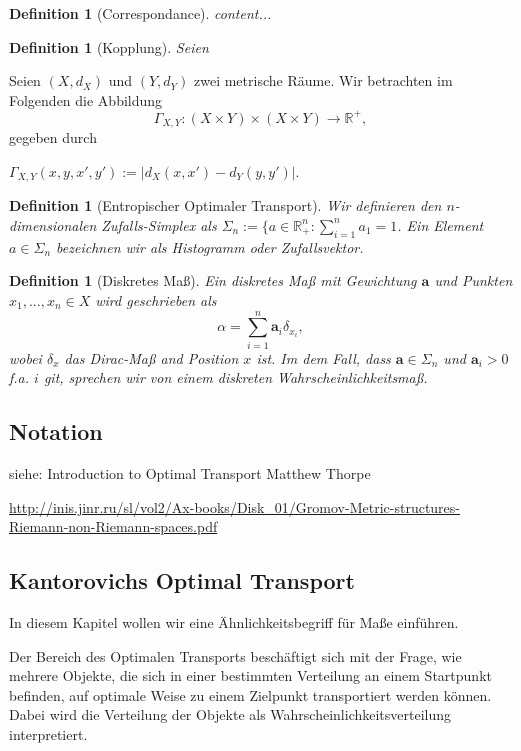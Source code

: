\documentclass[11pt,a4paper]{article}
\newtheorem{definition}[theorem]{Definition}
\numberwithin{equation}{section}
\begin{document}
	\begin{definition}[Correspondance]
		content...
	\end{definition}
	
	\begin{definition}[Kopplung]
		Seien 
	\end{definition}
	
	Seien $(X,d_X)$ und $(Y,d_Y)$ zwei metrische Räume. Wir betrachten im Folgenden die Abbildung
	\begin{equation}
	\Gamma_{X,Y}: (X\times Y) \times (X \times Y) \to \mathbb{R^{+}},
	\end{equation}
	gegeben durch
	
	$\Gamma_{X,Y}(x,y,x',y'):= |d_X(x,x') - d_Y(y,y')|$.
	
	
	\begin{definition}[Entropischer Optimaler Transport]
		Wir definieren den $n$-dimensionalen Zufalls-Simplex als $\Sigma_n := \lbrace a \in \mathbb{R}_+^n: \sum_{i=1}^{n}{a_1} = 1$. Ein Element $a \in \Sigma_n$ bezeichnen wir als Histogramm oder Zufallsvektor.
		
	\end{definition}
	
	\begin{definition}[Diskretes Maß]
		Ein diskretes Maß mit Gewichtung $\boldsymbol{a}$ und Punkten $x_1,...,x_n \in X$ wird geschrieben als
		\begin{equation}
		\alpha = \sum_{i=1}^n{\boldsymbol{a}_i\delta_{x_i}},
		\end{equation}
		wobei $\delta_x$ das Dirac-Maß and Position $x$ ist. Im dem Fall, dass $\boldsymbol{a} \in \Sigma_n$ und $\boldsymbol{a}_i >0$ f.a. $i$ git, sprechen wir von einem diskreten Wahrscheinlichkeitsmaß.
	\end{definition}
	\subsection{Notation}
	siehe: Introduction to Optimal Transport
	Matthew Thorpe
	
	\url{http://inis.jinr.ru/sl/vol2/Ax-books/Disk_01/Gromov-Metric-structures-Riemann-non-Riemann-spaces.pdf}
	\subsection{Kantorovichs Optimal Transport}
	In diesem Kapitel wollen wir eine Ähnlichkeitsbegriff für Maße einführen.
	
	Der Bereich des Optimalen Transports beschäftigt sich mit der Frage, wie mehrere Objekte, die sich in einer bestimmten Verteilung an einem Startpunkt befinden, auf optimale Weise zu einem Zielpunkt transportiert werden können. Dabei wird die Verteilung der Objekte als Wahrscheinlichkeitsverteilung interpretiert. 
	
\end{document}

